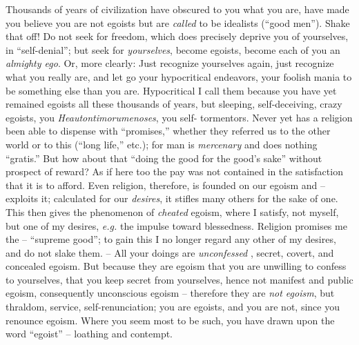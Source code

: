 \documentclass[12pt,a4paper]{book}
\begin{document}
Thousands of years of civilization have obscured to you what you are, have 
made you believe you are not egoists but are \textit{called} to be idealists 
(``good men''). Shake that off! Do not seek for freedom, which does 
precisely deprive you of yourselves, in ``self-denial''; but seek for 
\textit{yourselves}, become egoists, become each of you an \textit{almighty 
ego}. Or, more clearly: Just recognize yourselves again, just recognize what 
you really are, and let go your hypocritical endeavors, your foolish mania to 
be something else than you are. Hypocritical I call them because you have yet 
remained egoists all these thousands of years, but sleeping, self-deceiving, 
crazy egoists, you \textit{Heautontimorumenoses}, you self- tormentors. Never 
yet has a religion been able to dispense with ``promises,'' whether they 
referred us to the other world or to this (``long life,'' etc.); for man is 
\textit{mercenary} and does nothing ``gratis.'' But how about that ``doing 
the good for the good's sake'' without prospect of reward? As if here too the 
pay was not contained in the satisfaction that it is to afford. Even religion, 
therefore, is founded on our egoism and -- exploits it; calculated for our 
\textit{desires}, it stifles many others for the sake of one. This then gives 
the phenomenon of \textit{cheated} egoism, where I satisfy, not myself, but 
one of my desires, \textit{e.g.} the impulse toward blessedness. Religion 
promises me the -- ``supreme good''; to gain this I no longer regard any 
other of my desires, and do not slake them. -- All your doings are 
\textit{unconfessed} , secret, covert, and concealed egoism. But because they 
are egoism that you are unwilling to confess to yourselves, that you keep 
secret from yourselves, hence not manifest and public egoism, consequently 
unconscious egoism -- therefore they are \textit{not egoism}, but thraldom, 
service, self-renunciation; you are egoists, and you are not, since you 
renounce egoism. Where you seem most to be such, you have drawn upon the word 
``egoist'' -- loathing and contempt.
\end{document}
